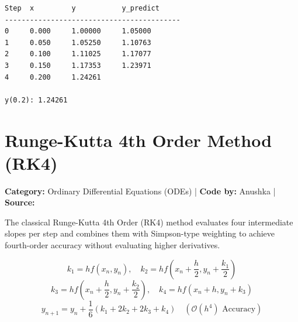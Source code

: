 \documentclass[10pt,a4paper]{report}
\begin{document}
\begin{tcolorbox}[colback=termbg,colframe=primary,title=\textbf{Program Execution Output \& Convergence Table},boxrule=1pt,arc=2mm]
\begin{lstlisting}[style=terminal_output]
Step  x         y           y_predict     
------------------------------------------
0     0.000     1.00000     1.05000       
1     0.050     1.05250     1.10763       
2     0.100     1.11025     1.17077       
3     0.150     1.17353     1.23971       
4     0.200     1.24261     

y(0.2): 1.24261
\end{lstlisting}
\end{tcolorbox}

\newpage

\section{Runge-Kutta 4th Order Method (RK4)}
\textbf{Category:} \textcolor{secondary}{Ordinary Differential Equations (ODEs)} \quad | \quad \textbf{Code by:} \textcolor{secondary}{Anushka} \quad | \quad \textbf{Source:} \texttt{}

The classical Runge-Kutta 4th Order (RK4) method evaluates four intermediate slopes per step and combines them with Simpson-type weighting to achieve fourth-order accuracy without evaluating higher derivatives.

\begin{tcolorbox}[colback=theorybg,colframe=theoryframe,title=\textbf{Mathematical Theory \& Formulation},boxrule=1pt,arc=2mm]
\[
k_1 = h f(x_n, y_n), \quad k_2 = h f\left(x_n + \frac{h}{2}, y_n + \frac{k_1}{2}\right)
\]
\[
k_3 = h f\left(x_n + \frac{h}{2}, y_n + \frac{k_2}{2}\right), \quad k_4 = h f(x_n + h, y_n + k_3)
\]
\[
y_{n+1} = y_n + \frac{1}{6}(k_1 + 2k_2 + 2k_3 + k_4) \quad (\mathcal{O}(h^4) \text{ Accuracy})
\]
\end{tcolorbox}
\end{document}
